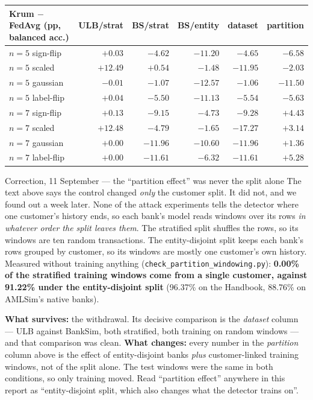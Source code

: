 \documentclass[11pt]{article}
\begin{document}
\begin{center}\small
\begin{tabularx}{\linewidth}{@{}X r r r r r@{}}
\toprule
\textbf{Krum $-$ FedAvg (pp, balanced acc.)} & \textbf{ULB/strat} & \textbf{BS/strat} & \textbf{BS/entity} & \textbf{dataset} & \textbf{partition} \\
\midrule
$n{=}5$ sign-flip & $+0.03$ & $-4.62$ & $-11.20$ & $-4.65$ & $-6.58$ \\
$n{=}5$ scaled & $+12.49$ & $+0.54$ & $-1.48$ & $-11.95$ & $-2.03$ \\
$n{=}5$ gaussian & $-0.01$ & $-1.07$ & $-12.57$ & $-1.06$ & $-11.50$ \\
$n{=}5$ label-flip & $+0.04$ & $-5.50$ & $-11.13$ & $-5.54$ & $-5.63$ \\
$n{=}7$ sign-flip & $+0.13$ & $-9.15$ & $-4.73$ & $-9.28$ & \textbf{$+4.43$} \\
$n{=}7$ scaled & $+12.48$ & $-4.79$ & $-1.65$ & $-17.27$ & \textbf{$+3.14$} \\
$n{=}7$ gaussian & $+0.00$ & $-11.96$ & $-10.60$ & $-11.96$ & \textbf{$+1.36$} \\
$n{=}7$ label-flip & $+0.00$ & $-11.61$ & $-6.32$ & $-11.61$ & \textbf{$+5.28$} \\
\bottomrule
\end{tabularx}
\end{center}

\begin{warnbox}{Correction, 11 September --- the ``partition effect'' was never the split alone}
The text above says the control changed \emph{only} the customer split. It did not, and we found out a
week later. None of the attack experiments tells the detector where one customer's history ends, so
each bank's model reads windows over its rows \emph{in whatever order the split leaves them}. The
stratified split shuffles the rows, so its windows are ten random transactions. The entity-disjoint
split keeps each bank's rows grouped by customer, so its windows are mostly one customer's own history.
Measured without training anything (\texttt{check\_partition\_windowing.py}): \textbf{0.00\% of the
stratified training windows come from a single customer, against 91.22\% under the entity-disjoint
split} (96.37\% on the Handbook, 88.76\% on AMLSim's native banks).

\textbf{What survives:} the withdrawal. Its decisive comparison is the \emph{dataset} column --- ULB
against BankSim, both stratified, both training on random windows --- and that comparison was clean.
\textbf{What changes:} every number in the \emph{partition} column above is the effect of entity-disjoint
banks \emph{plus} customer-linked training windows, not of the split alone. The test windows were the
same in both conditions, so only training moved. Read ``partition effect'' anywhere in this report as
``entity-disjoint split, which also changes what the detector trains on''.
\end{warnbox}
\end{document}
